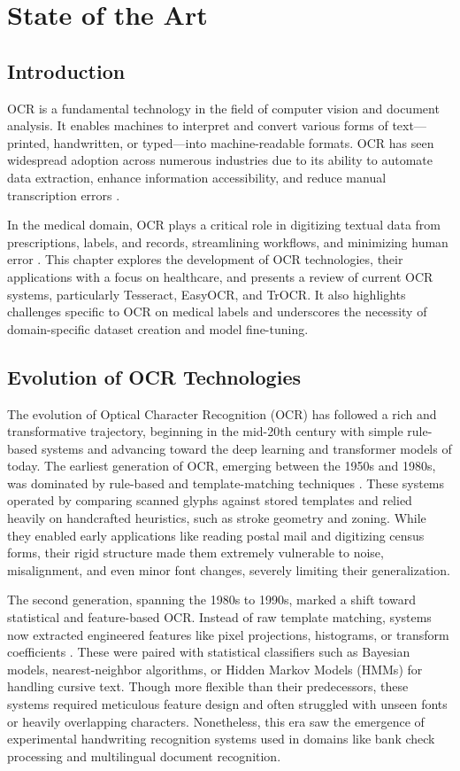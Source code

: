 \chapter{State of the Art}
\clearpage

\section{Introduction}
OCR is a fundamental technology in the field of computer vision and document analysis. It enables machines to interpret and convert various forms of text—printed, handwritten, or typed—into machine-readable formats. OCR has seen widespread adoption across numerous industries due to its ability to automate data extraction, enhance information accessibility, and reduce manual transcription errors \cite{Smith2007, Subramani2020}.%

In the medical domain, OCR plays a critical role in digitizing textual data from prescriptions, labels, and records, streamlining workflows, and minimizing human error \cite{Goodrum2020, Datta2025}. This chapter explores the development of OCR technologies, their applications with a focus on healthcare, and presents a review of current OCR systems, particularly Tesseract, EasyOCR, and TrOCR. It also highlights challenges specific to OCR on medical labels and underscores the necessity of domain-specific dataset creation and model fine-tuning.%

\section{Evolution of OCR Technologies}

The evolution of Optical Character Recognition (OCR) has followed a rich and transformative trajectory, beginning in the mid-20th century with simple rule-based systems and advancing toward the deep learning and transformer models of today. The earliest generation of OCR, emerging between the 1950s and 1980s, was dominated by rule-based and template-matching techniques \cite{casey1996survey}. These systems operated by comparing scanned glyphs against stored templates and relied heavily on handcrafted heuristics, such as stroke geometry and zoning. While they enabled early applications like reading postal mail and digitizing census forms, their rigid structure made them extremely vulnerable to noise, misalignment, and even minor font changes, severely limiting their generalization.

The second generation, spanning the 1980s to 1990s, marked a shift toward statistical and feature-based OCR. Instead of raw template matching, systems now extracted engineered features like pixel projections, histograms, or transform coefficients \cite{casey1996survey}. These were paired with statistical classifiers such as Bayesian models, nearest-neighbor algorithms, or Hidden Markov Models (HMMs) for handling cursive text. Though more flexible than their predecessors, these systems required meticulous feature design and often struggled with unseen fonts or heavily overlapping characters. Nonetheless, this era saw the emergence of experimental handwriting recognition systems used in domains like bank check processing and multilingual document recognition.

